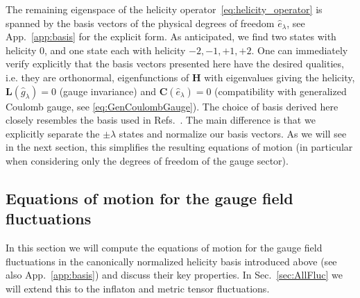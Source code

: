 The remaining eigenspace of the helicity operator~\eqref{eq:helicity_operator} is spanned by the basis vectors of the physical degrees of freedom $\hat e_\lambda$, see App.~\ref{app:basis} for the explicit form.
As anticipated, we find two states with helicity 0, and one state each with helicity $-2, -1, +1, +2$. One can immediately verify explicitly that the basis vectors presented here have the desired qualities, i.e. they are  orthonormal, eigenfunctions of $\mathbf{H}$ with eigenvalues giving the helicity, $\mathbf L(\hat g_\lambda) = 0$ (gauge invariance) and  $\mathbf{C}(\hat e_\lambda) = 0$ (compatibility with generalized Coulomb gauge, see \eqref{eq:GenCoulombGauge}). The choice of basis derived here closely resembles the basis used in Refs.~\cite{Dimastrogiovanni:2012ew,Adshead:2013nka,Adshead:2013qp,Namba:2013kia}. The main difference is that we explicitly separate the $\pm \lambda$ states and normalize our basis vectors. As we will see in the next section, this simplifies the resulting equations of motion (in particular when considering only the degrees of freedom of the gauge sector).







\subsection{Equations of motion for the gauge field fluctuations}
\label{sec:eom_gauge_fields}

In this section we will compute the equations of motion for the gauge field fluctuations in the canonically normalized helicity basis introduced above (see also App.~\eqref{app:basis}) and discuss their key properties. In Sec.~\ref{sec:AllFluc} we will extend this to the inflaton and metric tensor fluctuations.

